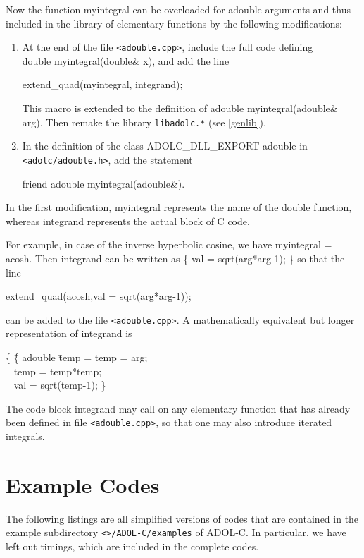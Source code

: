 \documentclass[11pt,twoside]{article}
\begin{document}
Now the function {\sf myintegral} can be overloaded for {\sf adouble}
arguments and thus included in the library of elementary functions 
by the following modifications:
\begin{enumerate}
\item
At the end of the file \verb=<adouble.cpp>=, include the full code
defining \\ {\sf double myintegral(double\& x)}, and add the line
\begin{center}
{\sf extend\_quad(myintegral, integrand); }
\end{center}
This macro is extended to the definition of 
 {\sf adouble myintegral(adouble\& arg)}.
Then remake the library \verb=libadolc.*= (see \autoref{genlib}). 
\item
In the definition of the class
{\sf ADOLC\_DLL\_EXPORT adouble} in \verb=<adolc/adouble.h>=, add the statement
\begin{center}
{\sf friend adouble myintegral(adouble\&)}.
\end{center}
\end{enumerate}
In the first modification, {\sf myintegral} represents the name of the
{\sf double} function, whereas {\sf integrand} represents the actual block
of C code. 

For example, in case of the inverse hyperbolic cosine, we have 
{\sf myintegral} = {\sf acosh}. Then {\sf integrand} can be written as 
{\sf \{ val = sqrt(arg*arg-1); \}} 
so that the line
\begin{center}
{\sf extend\_quad(acosh,val = sqrt(arg*arg-1));} 
\end{center}
can be added to the file \verb=<adouble.cpp>=.
A mathematically equivalent but longer representation of 
{\sf integrand} is
\begin{center}
\begin{tabbing}
{\sf \{ }\hspace{1.0in}\= {\sf  \{ adouble} \= temp =   \kill
  \> {\sf temp = arg;} \\
 \> \ \> {\sf  temp = temp*temp; } \\ 
 \> \ \> {\sf  val = sqrt(temp-1); \}}  
\end{tabbing}
\end{center} 
The code block {\sf integrand} may call on any elementary function that has already
been defined in file \verb=<adouble.cpp>=, so that one may also introduce
iterated integrals.
%
%
\section{Example Codes}
\label{example}
%
The following listings are all simplified versions of codes that
are contained in the example subdirectory 
\verb=<=\texttt{\packagetar}\verb=>/ADOL-C/examples= of ADOL-C. In particular,
we have left out timings, which are included in the complete codes.
%
\end{document}
